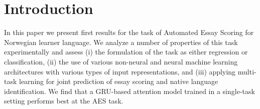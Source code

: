 \chapter{Introduction}

In this paper we present first results for the task of Automated Essay
Scoring for Norwegian learner language. We analyze a number of properties of
this task experimentally and assess (i) the formulation of the task as either
regression or classification, (ii) the use of various non-neural and neural
machine learning architectures with various types of input representations,
and (iii) applying multi-task learning for joint prediction of essay scoring
and native language identification. We find that a GRU-based attention model
trained in a single-task setting performs best at the AES task.
